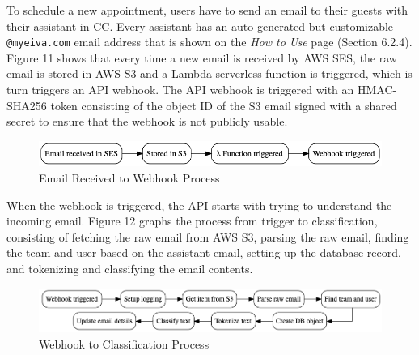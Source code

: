 \documentclass{article}
\begin{document}
To schedule a new appointment, users have to send an email to their guests with their assistant in CC. Every assistant has an auto-generated but customizable \texttt{@myeiva.com} email address that is shown on the \emph{How to Use} page (Section 6.2.4). Figure 11 shows that every time a new email is received by AWS SES, the raw email is stored in AWS S3 and a Lambda serverless function is triggered, which is turn triggers an API webhook. The API webhook is triggered with an HMAC-SHA256 token consisting of the object ID of the S3 email signed with a shared secret to ensure that the webhook is not publicly usable.

\begin{figure}
	\includegraphics[width=\textwidth]{ses-process.png}
	\caption{Email Received to Webhook Process}
\end{figure}

When the webhook is triggered, the API starts with trying to understand the incoming email. Figure 12 graphs the process from trigger to classification, consisting of fetching the raw email from AWS S3, parsing the raw email, finding the team and user based on the assistant email, setting up the database record, and tokenizing and classifying the email contents.

\begin{figure}
	\includegraphics[width=\textwidth]{webhook-process.png}
	\caption{Webhook to Classification Process}
\end{figure}
\end{document}
